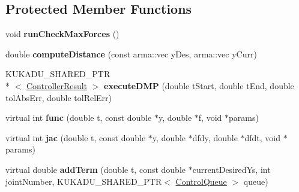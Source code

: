 \subsection*{Protected Member Functions}
\begin{DoxyCompactItemize}
\item 
\hypertarget{classkukadu_1_1DMPExecutor_ab3c4a6e121917b95259aabfcfc348c5b}{void {\bfseries run\-Check\-Max\-Forces} ()}\label{classkukadu_1_1DMPExecutor_ab3c4a6e121917b95259aabfcfc348c5b}

\item 
\hypertarget{classkukadu_1_1DMPExecutor_acc239e5c025fca330fac28590e25721e}{double {\bfseries compute\-Distance} (const arma\-::vec y\-Des, arma\-::vec y\-Curr)}\label{classkukadu_1_1DMPExecutor_acc239e5c025fca330fac28590e25721e}

\item 
\hypertarget{classkukadu_1_1DMPExecutor_ac7930124bda370eed2097e5edbc764cd}{K\-U\-K\-A\-D\-U\-\_\-\-S\-H\-A\-R\-E\-D\-\_\-\-P\-T\-R\\*
$<$ \hyperlink{classkukadu_1_1ControllerResult}{Controller\-Result} $>$ {\bfseries execute\-D\-M\-P} (double t\-Start, double t\-End, double tol\-Abs\-Err, double tol\-Rel\-Err)}\label{classkukadu_1_1DMPExecutor_ac7930124bda370eed2097e5edbc764cd}

\item 
\hypertarget{classkukadu_1_1DMPExecutor_a36fbd2e7ec4aa92d3547716781e92c25}{virtual int {\bfseries func} (double t, const double $\ast$y, double $\ast$f, void $\ast$params)}\label{classkukadu_1_1DMPExecutor_a36fbd2e7ec4aa92d3547716781e92c25}

\item 
\hypertarget{classkukadu_1_1DMPExecutor_a7653d938ffa32d0d6e3401e7db17a87e}{virtual int {\bfseries jac} (double t, const double $\ast$y, double $\ast$dfdy, double $\ast$dfdt, void $\ast$params)}\label{classkukadu_1_1DMPExecutor_a7653d938ffa32d0d6e3401e7db17a87e}

\item 
\hypertarget{classkukadu_1_1DMPExecutor_a8dd322182fb9b37f9a6661865ad66251}{virtual double {\bfseries add\-Term} (double t, const double $\ast$current\-Desired\-Ys, int joint\-Number, K\-U\-K\-A\-D\-U\-\_\-\-S\-H\-A\-R\-E\-D\-\_\-\-P\-T\-R$<$ \hyperlink{classkukadu_1_1ControlQueue}{Control\-Queue} $>$ queue)}\label{classkukadu_1_1DMPExecutor_a8dd322182fb9b37f9a6661865ad66251}

\end{DoxyCompactItemize}
